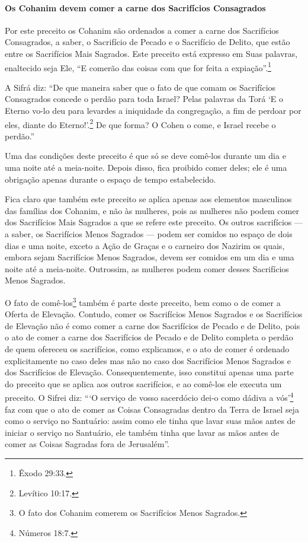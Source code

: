 \paragraph{Os Cohanim devem comer a carne dos Sacrifícios Consagrados}

Por este preceito os Cohanim são ordenados a comer a carne dos
Sacrifícios Consagrados, a saber, o Sacrifício de Pecado e o Sacrifício
de Delito, que estão entre os Sacrifícios Mais Sagrados. Este preceito
está expresso em Suas palavras, enaltecido seja Ele, ``E comerão das
coisas com que for feita a expiação''.\footnote{Êxodo 29:33.}

A Sifrá diz: ``De que maneira saber que o fato de que comam os
Sacrifícios Consagrados concede o perdão para toda Israel? Pelas
palavras da Torá `E o Eterno vo-lo deu para levardes a iniquidade da
congregação, a fim de perdoar por eles, diante do Eterno!'.\footnote{Levítico
10:17.} De que forma? O Cohen o come, e Israel recebe o perdão.''

Uma das condições deste preceito é que só se deve comê-los durante um
dia e uma noite até a meia-noite. Depois disso, fica proibido comer
deles; ele é uma obrigação apenas durante o espaço de tempo
estabelecido.

Fica claro que também este preceito se aplica apenas aos elementos
masculinos das famílias dos Cohanim, e não às mulheres, pois as
mulheres não podem comer dos Sacrifícios Mais Sagrados a que se refere
este preceito. Os outros sacrifícios --- a saber, os Sacrifícios Menos
Sagrados --- podem ser comidos no espaço de dois dias e uma noite,
exceto a Ação de Graças e o carneiro dos Nazirim os quais, embora sejam
Sacrifícios Menos Sagrados, devem ser comidos em um dia e uma noite até
a meia-noite. Outrossim, as mulheres podem comer desses Sacrifícios
Menos Sagrados.

O fato de comê-los\footnote{O fato dos Cohanim comerem os Sacrifícios Menos Sagrados.} também é parte deste preceito,
bem como o de comer a Oferta de Elevação. Contudo, comer os Sacrifícios
Menos Sagrados e os Sacrifícios de Elevação não é como comer a carne dos
Sacrifícios de Pecado e de Delito, pois o ato de comer a carne dos
Sacrifícios de Pecado e de Delito completa o perdão de quem ofereceu os
sacrifícios, como explicamos, e o ato de comer é ordenado explicitamente
no caso deles mas não no caso dos Sacrifícios Menos Sagrados e dos Sacrifícios de Elevação.
Consequentemente, isso constitui apenas uma parte do preceito que se
aplica aos outros sacrifícios, e ao comê-los ele executa um preceito. O
Sifrei diz: ```O serviço de vosso sacerdócio dei-o como dádiva a vós'\footnote{Números 18:7.} faz com que o ato de comer as Coisas Consagradas dentro
da Terra de Israel seja como o serviço no Santuário: assim como ele
tinha que lavar suas mãos antes de iniciar o serviço no Santuário, ele
também tinha que lavar as mãos antes de comer as Coisas Sagradas fora de
Jerusalém''.

